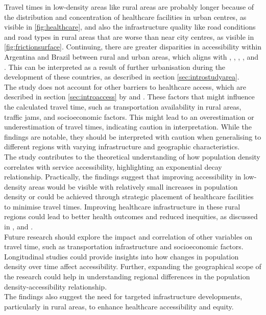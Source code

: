 \documentclass[11pt, a4paper]{report}
\begin{document}
Travel times in low-density areas like rural areas are probably longer because of the distribution and concentration of healthcare facilities in urban centres, as visible in \ref{fig:healthcare}, and also the infrastructure quality like road conditions and road types in rural areas that are worse than near city centres, as visible in \ref{fig:frictionsurface}. Continuing, there are greater disparities in accessibility within Argentina and Brazil between rural and urban areas, which aligns with \citet{gilardino_access_2016}, \citet{palacios_need_2020}, \citet{vacarezza_exploring_2023}, \citet{hone_effect_2019}, \citet{silva_emergency_2021} and \citet{palmeira_analysis_2022}. This can be interpreted as a result of further urbanisation during the development of these countries, as described in section \ref{sec:introstudyarea}. \\
%
The study does not account for other barriers to healthcare access, which are described in section \ref{sec:introaccess} by \citet{wang_assessing_2005} and \citet{carrillo_defining_2011}. These factors that might influence the calculated travel time, such as transportation availability in rural areas, traffic jams, and socioeconomic factors. This might lead to an overestimation or underestimation of travel times, indicating caution in interpretation. 
While the findings are notable, they should be interpreted with caution when generalising to different regions with varying infrastructure and geographic characteristics. \\
%
The study contributes to the theoretical understanding of how population density correlates with service accessibility, highlighting an exponential decay relationship. Practically, the findings suggest that improving accessibility in low-density areas would be visible with relatively small increases in population density or could be achieved through strategic placement of healthcare facilities to minimise travel times. Improving healthcare infrastructure in these rural regions could lead to better health outcomes and reduced inequities, as discussed in \citet{syed_traveling_2013}, \citet{davy_access_2016} and \citet{zhao_economic_2016}.\\
%
Future research should explore the impact and correlation of other variables on travel time, such as transportation infrastructure and socioeconomic factors. Longitudinal studies could provide insights into how changes in population density over time affect accessibility. Further, expanding the geographical scope of the research could help in understanding regional differences in the population density-accessibility relationship.\\
%
The findings also suggest the need for targeted infrastructure developments, particularly in rural areas, to enhance healthcare accessibility and equity.
\end{document}
